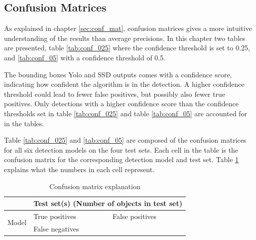 \subsection{Confusion Matrices}
\label{subsec:cm}

As explained in chapter \ref{sec:conf_mat}, confusion matrices gives a more intuitive understanding of the results than average precisions. In this chapter two tables are presented, table \ref{tab:conf_025} where the confidence threshold is set to 0.25, and \ref{tab:conf_05} with a confidence threshold of 0.5.

\vspace{3mm}
\noindent
The bounding boxes Yolo and SSD outputs comes with a confidence score, indicating how confident the algorithm is in the detection. A higher confidence threshold could lead to fewer false positives, but possibly also fewer true positives. Only detections with a higher confidence score than the confidence thresholds set in table \ref{tab:conf_025} and table \ref{tab:conf_05} are accounted for in the tables.

\vspace{3mm}
\noindent
Table \ref{tab:conf_025} and \ref{tab:conf_05} are composed of the confusion matrices for all six detection models on the four test sets. Each cell in the table is the confusion matrix for the corresponding detection model and test set. Table \ref{tab:conf_exp} explains what the numbers in each cell represent.



\begin{table}[h!]
\centering
\begin{tabular}{c|ll}
\multicolumn{1}{l|}{}  & \multicolumn{2}{l}{Test set(s) (Number of objects in test set)} \\ \hline
\multirow{2}{*}{Model} & True positives        & False positives                    \\
                       & False negatives       &    
\end{tabular}
\caption{Confusion matrix explanation}
\label{tab:conf_exp}
\end{table}

